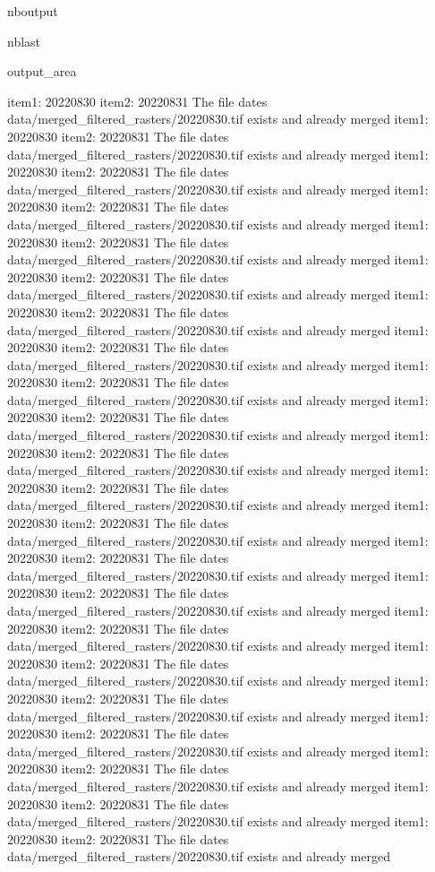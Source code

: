 \documentclass[letterpaper,10pt]{sphinxmanual}
\begin{document}
\begin{sphinxuseclass}{nboutput}
\begin{sphinxuseclass}{nblast}
{\begin{sphinxuseclass}{output_area}
\begin{sphinxuseclass}{}
\begin{sphinxVerbatim}[commandchars=\\\{\}]
item1:  20220830
item2:  20220831
The file dates data/merged\_filtered\_rasters/20220830.tif exists and already merged
item1:  20220830
item2:  20220831
The file dates data/merged\_filtered\_rasters/20220830.tif exists and already merged
item1:  20220830
item2:  20220831
The file dates data/merged\_filtered\_rasters/20220830.tif exists and already merged
item1:  20220830
item2:  20220831
The file dates data/merged\_filtered\_rasters/20220830.tif exists and already merged
item1:  20220830
item2:  20220831
The file dates data/merged\_filtered\_rasters/20220830.tif exists and already merged
item1:  20220830
item2:  20220831
The file dates data/merged\_filtered\_rasters/20220830.tif exists and already merged
item1:  20220830
item2:  20220831
The file dates data/merged\_filtered\_rasters/20220830.tif exists and already merged
item1:  20220830
item2:  20220831
The file dates data/merged\_filtered\_rasters/20220830.tif exists and already merged
item1:  20220830
item2:  20220831
The file dates data/merged\_filtered\_rasters/20220830.tif exists and already merged
item1:  20220830
item2:  20220831
The file dates data/merged\_filtered\_rasters/20220830.tif exists and already merged
item1:  20220830
item2:  20220831
The file dates data/merged\_filtered\_rasters/20220830.tif exists and already merged
item1:  20220830
item2:  20220831
The file dates data/merged\_filtered\_rasters/20220830.tif exists and already merged
item1:  20220830
item2:  20220831
The file dates data/merged\_filtered\_rasters/20220830.tif exists and already merged
item1:  20220830
item2:  20220831
The file dates data/merged\_filtered\_rasters/20220830.tif exists and already merged
item1:  20220830
item2:  20220831
The file dates data/merged\_filtered\_rasters/20220830.tif exists and already merged
item1:  20220830
item2:  20220831
The file dates data/merged\_filtered\_rasters/20220830.tif exists and already merged
item1:  20220830
item2:  20220831
The file dates data/merged\_filtered\_rasters/20220830.tif exists and already merged
item1:  20220830
item2:  20220831
The file dates data/merged\_filtered\_rasters/20220830.tif exists and already merged
item1:  20220830
item2:  20220831
The file dates data/merged\_filtered\_rasters/20220830.tif exists and already merged
item1:  20220830
item2:  20220831
The file dates data/merged\_filtered\_rasters/20220830.tif exists and already merged
item1:  20220830
item2:  20220831
The file dates data/merged\_filtered\_rasters/20220830.tif exists and already merged
item1:  20220830
item2:  20220831
The file dates data/merged\_filtered\_rasters/20220830.tif exists and already merged

\end{sphinxVerbatim}
\end{sphinxuseclass}
\end{sphinxuseclass}}
\end{sphinxuseclass}
\end{sphinxuseclass}
\end{document}
